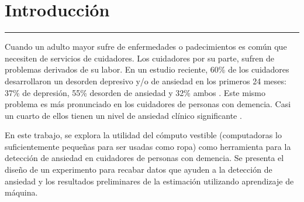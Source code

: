 
\chapter{Introducci\'on}\label{capit:cap1}
\vspace{-2.0325ex}%
\noindent
\rule{\textwidth}{0.5pt}
\vspace{-5.5ex}%
\newcommand{\pushline}{\Indp}


Cuando un adulto mayor sufre de enfermedades o padecimientos es com\'un que necesiten de servicios de cuidadores. Los cuidadores por su parte, sufren de problemas derivados de su labor. En un estudio reciente, 60\% de los cuidadores desarrollaron un desorden depresivo y/o de ansiedad en los primeros 24 meses: 37\% de depresi\'on, 55\% desorden de ansiedad y 32\% ambos \citep{Joling2014}. Este mismo problema es m\'as pronunciado en los cuidadores de personas con demencia.  Casi un cuarto de ellos tienen un nivel de ansiedad cl\'inico significante \citep{Cooper200615}.

	En este trabajo, se explora la utilidad del c\'omputo vestible (computadoras lo suficientemente peque\~nas para ser usadas como ropa) como herramienta para la detecci\'on de ansiedad en cuidadores de personas con demencia. Se presenta el dise\~no de un experimento para recabar datos que ayuden a la detecci\'on de ansiedad y los resultados preliminares de la estimaci\'on utilizando aprendizaje de m\'aquina.
	
	
	
	
	

	

